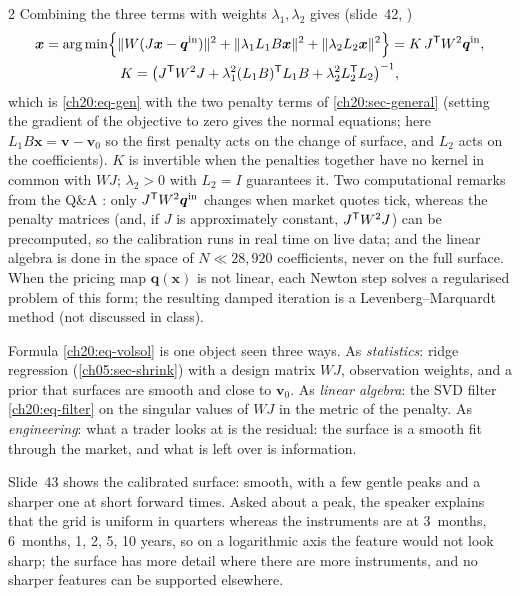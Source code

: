 \begin{paracol}{2}
Combining the three terms with weights $\lambda_1,\lambda_2$ gives (slide~42, )
\begin{equation}\label{ch20:eq-volsol}
\begin{gathered}
  \bm x=\arg\min\Bigl\{\|W(J\bm x-\bm q^{\rm in})\|^2+\|\lambda_1L_1B\bm x\|^2+\|\lambda_2L_2\bm x\|^2\Bigr\}=K\,J^{\mathsf T} W^2\bm q^{\rm in},\\
  K=\bigl(J^{\mathsf T} W^2J+\lambda_1^2(L_1B)^{\mathsf T} L_1B+\lambda_2^2L_2^{\mathsf T} L_2\bigr)^{-1},
\end{gathered}
\end{equation}
which is \eqref{ch20:eq-gen} with the two penalty terms of \cref{ch20:sec-general} (setting the gradient of the objective to zero gives the normal equations; here $L_1B\bm x=\bm v-\bm v_0$ so the first penalty acts on the change of surface, and $L_2$ acts on the coefficients).
$K$ is invertible when the penalties together have no kernel in common with $WJ$; $\lambda_2>0$ with $L_2=I$ guarantees it. Two computational remarks from the Q\&A : only $J^{\mathsf T} W^2\bm q^{\rm in}$ changes when market quotes tick, whereas the penalty matrices (and, if $J$ is
approximately constant, $J^{\mathsf T} W^2J$) can be precomputed, so the calibration runs in real time on live data; and the linear algebra is done in the space of $N\ll28{,}920$ coefficients, never on the full surface. When the pricing map $\bm q(\bm x)$ is not linear, each Newton step solves a regularised problem of this form; the resulting damped iteration is a
Levenberg--Marquardt method (not discussed in class).

\begin{intuition}
Formula \eqref{ch20:eq-volsol} is one object seen three ways. As \emph{statistics}: ridge regression (\cref{ch05:sec-shrink}) with a design matrix $WJ$, observation weights, and a prior that surfaces are smooth and close to $\bm v_0$. As \emph{linear algebra}: the SVD filter \eqref{ch20:eq-filter} on
the singular values of $WJ$ in the metric of the penalty. As \emph{engineering}: what a trader looks at is the residual: the surface is a smooth fit through the market, and what is left over is information.
\end{intuition}

Slide~43 shows the calibrated surface: smooth, with a few gentle peaks and a sharper one at short forward times. Asked about a peak, the speaker explains  that the grid is uniform in quarters whereas the instruments are at
3~months, 6~months, 1, 2, 5, 10 years, so on a logarithmic axis the feature would not look sharp; the surface has more detail where there are more instruments, and no sharper features can be supported elsewhere.


\end{paracol}
